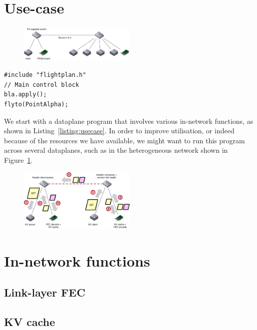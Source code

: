 \documentclass[letterpaper,twocolumn,10pt]{article}
\begin{document}
\section{Use-case}

\begin{figure}[t]
\centering
\includegraphics[width=0.5\textwidth]{eval_setup.pdf}
\caption{\label{fig:eval:setup}
\TODO{}  
}
\end{figure}


\begin{lstlisting}[caption=Program to be split.,
  label=listing:usecase,
  float=t]
#include "flightplan.h"
// Main control block
bla.apply();
flyto(PointAlpha);

\end{lstlisting}

We start with a dataplane program that involves various in-network functions,
as shown in Listing~\ref{listing:usecase}. In order to improve utilisation, or
indeed because of the resources we have available, we might want to run this
program across several dataplanes, such as in the heterogeneous network shown
in Figure~\ref{fig:eval:setup}.

\begin{figure}[t]
\centering
\includegraphics[width=0.5\textwidth]{scenario1.pdf}
\caption{\label{fig:usecase:scenario1}
\TODO{}  
}
\end{figure}


\section{In-network functions}
\subsection{Link-layer FEC}
\subsection{KV cache}
\end{document}
